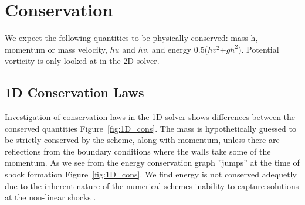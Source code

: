 \section{Conservation}

We expect the following quantities to be physically conserved: mass h, momentum or mass velocity, $hu$ and $hv$, and
energy 0.5($hv^2$+$gh^2$). Potential vorticity is only looked at in the 2D solver. 

\subsection{1D Conservation Laws}
Investigation of conservation laws in the 1D solver shows differences
between the conserved quantities Figure~\ref{fig:1D_cons}. The mass is hypothetically guessed to be strictly conserved by the scheme, along with 
momentum, unless there are reflections from the boundary conditions where the walls take some of the momentum. As we see from the energy conservation 
graph ''jumps'' at the time of shock formation Figure~\ref{fig:1D_cons}. We find energy is not conserved 
adequetly due to the inherent nature of the numerical schemes inability to capture solutions at the non-linear shocks \cite{Lax}. 
\newline

